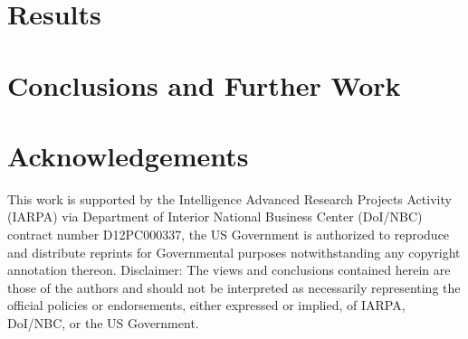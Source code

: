 \documentclass[twoside,leqno,twocolumn]{article}
\begin{document}
\vspace{-1em}
\section{\label{sec:results} Results}


\vspace{-1em}
\section{\label{sec:conclusions} Conclusions and Further Work}


\section*{Acknowledgements}
{\scriptsize
This work is supported by the Intelligence Advanced Research Projects Activity
(IARPA) via Department of Interior National Business Center (DoI/NBC)
contract number D12PC000337, the US Government is authorized to
reproduce and distribute reprints for Governmental purposes
notwithstanding any copyright annotation thereon. Disclaimer: The
views and conclusions contained herein are those of the authors and
should not be interpreted as necessarily representing the official
policies or endorsements, either expressed or implied, of IARPA,
DoI/NBC, or the US Government.
}
\vspace{-1em}










\end{document}
